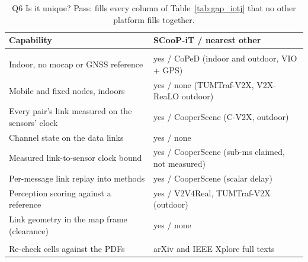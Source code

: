 \begin{table}[t]
\centering
\caption{Q6 Is it unique? Pass: fills every column of
Table~\ref{tab:gap_iotj} that no other platform fills together.}
\label{tab:res_q6}
\footnotesize
\setlength{\tabcolsep}{3pt}
\begin{tabularx}{\columnwidth}{@{}>{\raggedright\arraybackslash}X >{\raggedright\arraybackslash}p{4.1cm}@{}}
\toprule
Capability & SCooP-iT / nearest other \\
\midrule
\multicolumn{2}{@{}l}{\emph{Answered}} \\
Indoor, no mocap or GNSS reference & yes / CoPeD (indoor and outdoor, VIO + GPS) \\
Mobile and fixed nodes, indoors & yes / none (TUMTraf-V2X, V2X-ReaLO outdoor) \\
Every pair's link measured on the sensors' clock & yes / CooperScene (C-V2X, outdoor) \\
Channel state on the data links & yes / none \\
Measured link-to-sensor clock bound & yes / CooperScene (sub-ms claimed, not measured) \\
Per-message link replay into methods & yes / CooperScene (scalar delay) \\
Perception scoring against a reference & yes / V2V4Real, TUMTraf-V2X (outdoor) \\
Link geometry in the map frame (clearance) & yes / none \\
\midrule
\multicolumn{2}{@{}l}{\emph{Still needed}} \\
Re-check cells against the PDFs & arXiv and IEEE Xplore full texts \\
\bottomrule
\end{tabularx}
\end{table}
